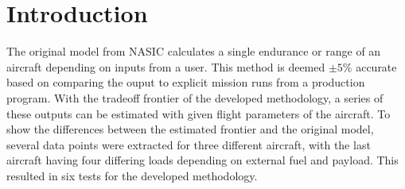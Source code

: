 \section{Introduction}
The original model from NASIC calculates a single endurance or range of an aircraft depending on inputs from a user. This method is deemed $\pm 5\%$ accurate based on comparing the ouput to explicit mission runs from a production program. With the tradeoff frontier of the developed methodology, a series of these outputs can be estimated with given flight parameters of the aircraft. To show the differences between the estimated frontier and the original model, several data points were extracted for three different aircraft, with the last aircraft having four differing loads depending on external fuel and payload. This resulted in six tests for the developed methodology.\par
